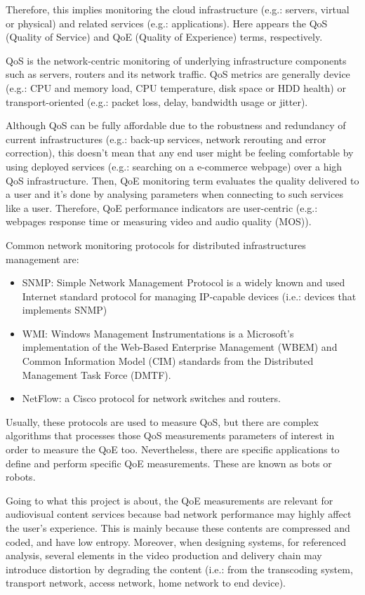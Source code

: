 Therefore, this implies monitoring the cloud infrastructure (e.g.: servers, virtual or physical) and related services (e.g.: applications). Here appears the QoS (Quality of Service) and QoE (Quality of Experience) terms, respectively.

QoS is the network-centric monitoring of underlying infrastructure components such as servers, routers and its network traffic. QoS metrics are generally device (e.g.: CPU and memory load, CPU temperature, disk space or HDD health) or transport-oriented (e.g.: packet loss, delay, bandwidth usage or jitter). 

Although QoS can be fully affordable due to the robustness and redundancy of current infrastructures (e.g.: back-up services, network rerouting and error correction), this doesn't mean that any end user might be feeling comfortable by using deployed services (e.g.: searching on a e-commerce webpage) over a high QoS infrastructure. Then, QoE monitoring term evaluates the quality delivered to a user and it's done by analysing parameters when connecting to such services like a user. Therefore, QoE performance indicators are user-centric (e.g.: webpages response time or measuring video and audio quality (MOS)).

Common network monitoring protocols for distributed infrastructures management are:

\begin{itemize}
\item SNMP: Simple Network Management Protocol is a widely known and used Internet standard protocol for managing IP-capable devices (i.e.: devices that implements SNMP)
\item WMI: Windows Management Instrumentations is a Microsoft's implementation of the Web-Based Enterprise Management (WBEM) and Common Information Model (CIM) standards from the Distributed Management Task Force (DMTF).
\item NetFlow: a Cisco protocol for network switches and routers.
\end{itemize}  

Usually, these protocols are used to measure QoS, but there are complex algorithms that processes those QoS measurements parameters of interest in order to measure the QoE too. Nevertheless, there are specific applications to define and perform specific QoE measurements. These are known as bots or robots.

Going to what this project is about, the QoE measurements are relevant for audiovisual content services because bad network performance may highly affect the user's experience. This is mainly because these contents are compressed and coded, and have low entropy. Moreover, when designing systems, for referenced analysis, several elements in the video production and delivery chain may introduce distortion by degrading the content (i.e.: from the transcoding system, transport network, access network, home network to end device).

